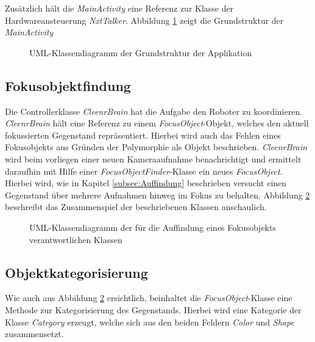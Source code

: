 Zusätzlich hält die \textit{MainActivity} eine Referenz zur Klasse der Hardwareansteuerung \textit{NxtTalker}. Abbildung \ref{fig:UMLActivity} zeigt die Grundstruktur der \textit{MainActivity}

\begin{figure}[h]
\centering
\caption{UML-Klassendiagramm der Grundstruktur der Applikation}
\label{fig:UMLActivity}
\end{figure}

 
\subsection{Fokusobjektfindung}

Die Controllerklasse \textit{CleenrBrain} hat die Aufgabe den Roboter zu koordinieren. \textit{CleenrBrain} hält eine Referenz zu einem \textit{FocusObject}-Objekt, welches den aktuell fokussierten Gegenstand repräsentiert. Hierbei wird auch das Fehlen eines Fokusobjekts aus Gründen der Polymorphie als Objekt beschrieben. \textit{CleenrBrain} wird beim vorliegen einer neuen Kameraaufnahme benachrichtigt und ermittelt daraufhin mit Hilfe einer \textit{FocusObjectFinder}-Klasse ein neues \textit{FocusObject}. Hierbei wird, wie in Kapitel \ref{subsec:Auffindung} beschrieben versucht einen Gegenstand über mehrere Aufnahmen hinweg im Fokus zu behalten. Abbildung \ref{fig:UMLFocus} beschreibt das Zusammenspiel der beschriebenen Klassen anschaulich.

\begin{figure}[h]
\centering
\caption{UML-Klassendiagramm der für die Auffindung eines Fokusobjekts verantwortlichen Klassen}
\label{fig:UMLFocus}
\end{figure}

\subsection{Objektkategorisierung}

Wie auch aus Abbildung \ref{fig:UMLFocus} ersichtlich, beinhaltet die \textit{FocusObject}-Klasse eine Methode zur Kategorisierung des Gegenstands. Hierbei wird eine Kategorie der Klasse \textit{Category} erzeugt, welche sich aus den beiden Feldern \textit{Color} und \textit{Shape} zusammensetzt.

